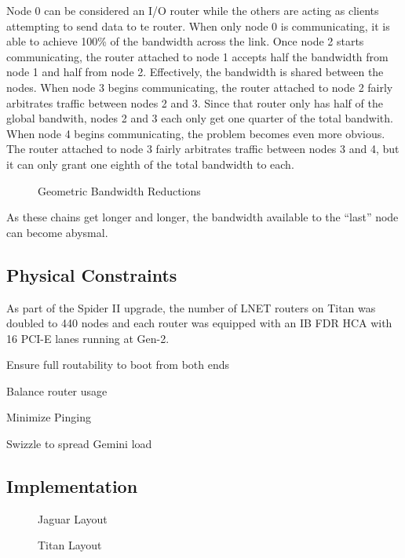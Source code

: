 Node 0 can be considered an I/O router while the others are acting as clients
attempting to send data to te router.  When only node 0 is communicating, it is
able to achieve 100\% of the bandwidth across the link.  Once node 2 starts
communicating, the router attached to node 1 accepts half the bandwidth from
node 1 and half from node 2.  Effectively, the bandwidth is shared between the
nodes.  When node 3 begins communicating, the router attached to node 2 fairly
arbitrates traffic between nodes 2 and 3.  Since that router only has half of
the global bandwith, nodes 2 and 3 each only get one quarter of the total
bandwith.  When node 4 begins communicating, the problem becomes even more
obvious.  The router attached to node 3 fairly arbitrates traffic between nodes
3 and 4, but it can only grant one eighth of the total bandwidth to each.

\begin{figure}[h]
  \centering
  
  \caption{Geometric Bandwidth Reductions}\label{fig:geombw}
\end{figure}

As these chains get longer and longer, the bandwidth available to the ``last''
node can become abysmal.

\subsection{Physical Constraints}

As part of the Spider II upgrade, the number of LNET routers on Titan was
doubled to 440 nodes and each router was equipped with an IB FDR HCA with 16
PCI-E lanes running at Gen-2.

Ensure full routability to boot from both ends

Balance router usage

Minimize Pinging

Swizzle to spread Gemini load

\subsection{Implementation}

\begin{figure*}[!h]
  \newcommand{\barec}[1]{\multicolumn{1}{c}{#1}}
  \begin{center}
    
    \caption{Jaguar Layout}
    \vspace{5mm}
    
    \caption{Titan Layout}
  \end{center}
\end{figure*}
